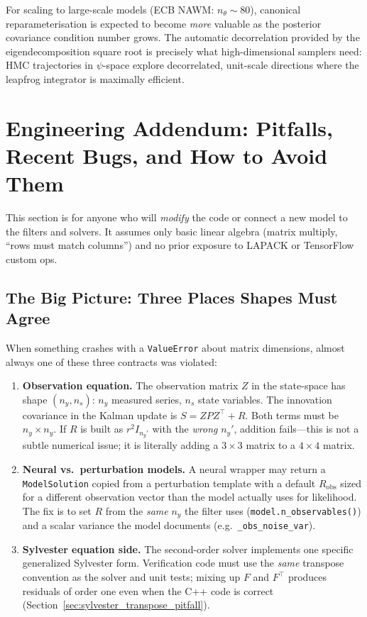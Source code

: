 \documentclass[11pt,a4paper]{article}
\theoremstyle{definition}
\newcommand{\code}[1]{\texttt{\color{codecolor}#1}}
\begin{document}
	For scaling to large-scale models (ECB NAWM: $n_\theta \sim 80$), canonical reparameterisation is expected to become \emph{more} valuable as the posterior covariance condition number grows.
	The automatic decorrelation provided by the eigendecomposition square root is precisely what high-dimensional samplers need: HMC trajectories in $\psi$-space explore decorrelated, unit-scale directions where the leapfrog integrator is maximally efficient.
	
	
	\section{Engineering Addendum: Pitfalls, Recent Bugs, and How to Avoid Them}
	\label{sec:pitfalls}
	
	This section is for anyone who will \emph{modify} the code or connect a new model to the filters and solvers.
	It assumes only basic linear algebra (matrix multiply, ``rows must match columns'') and no prior exposure to LAPACK or TensorFlow custom ops.
	
	\subsection{The Big Picture: Three Places Shapes Must Agree}
	
	When something crashes with a \code{ValueError} about matrix dimensions, almost always one of these three contracts was violated:
	\begin{enumerate}[leftmargin=*]
		\item \textbf{Observation equation.} The observation matrix $Z$ in the state-space has shape $(n_y, n_s)$: $n_y$ measured series, $n_s$ state variables.
		The innovation covariance in the Kalman update is $S = Z P Z^\top + R$.
		Both terms must be $n_y \times n_y$.
		If $R$ is built as $r^2 I_{n_y'}$ with the \emph{wrong} $n_y'$, addition fails---this is not a subtle numerical issue; it is literally adding a $3 \times 3$ matrix to a $4 \times 4$ matrix.
		\item \textbf{Neural vs.\ perturbation models.} A neural wrapper may return a \code{ModelSolution} copied from a perturbation template with a default $R_{\mathrm{obs}}$ sized for a different observation vector than the model actually uses for likelihood.
		The fix is to set $R$ from the \emph{same} $n_y$ the filter uses (\code{model.n\_observables()}) and a scalar variance the model documents (e.g.\ \code{\_obs\_noise\_var}).
		\item \textbf{Sylvester equation side.} The second-order solver implements one specific generalized Sylvester form.
		Verification code must use the \emph{same} transpose convention as the solver and unit tests; mixing up $F$ and $F^\top$ produces residuals of order one even when the C++ code is correct (Section~\ref{sec:sylvester_transpose_pitfall}).
	\end{enumerate}
	
\end{document}

